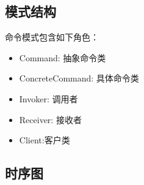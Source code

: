 \documentclass[letterpaper,10pt,english]{sphinxmanual}
\begin{document}
\subsection{模式结构}
\label{\detokenize{behavioral_patterns/command:id5}}
\sphinxAtStartPar
命令模式包含如下角色：
\begin{itemize}
\item {} 
\sphinxAtStartPar
Command: 抽象命令类

\item {} 
\sphinxAtStartPar
ConcreteCommand: 具体命令类

\item {} 
\sphinxAtStartPar
Invoker: 调用者

\item {} 
\sphinxAtStartPar
Receiver: 接收者

\item {} 
\sphinxAtStartPar
Client:客户类

\end{itemize}

\noindent{}


\subsection{时序图}
\label{\detokenize{behavioral_patterns/command:id6}}
\noindent{}
\end{document}
